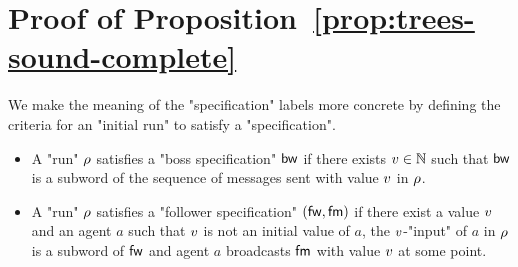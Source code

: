 \section{Proof of Proposition~\ref{prop:trees-sound-complete}}
\label{app:trees-sound-complete}

\treessoundcomplete*
 


We make the meaning of the "specification" labels more concrete by defining the criteria for an "initial run" to satisfy a "specification".

\begin{itemize}
	\item A "run" $\rho$ satisfies a "boss specification" $\mathsf{bw}$ if there exists $v \in \mathbb{N}$ such that $\mathsf{bw}$ is a subword of the sequence of messages sent with value $v$ in $\rho$.
	
	\item A "run" $\rho$ satisfies a "follower specification" $(\mathsf{fw}, \mathsf{fm})$ if there exist a value $v$ and an agent $a$ such that $v$ is not an initial value of $a$, the $v$-"input" of $a$ in $\rho$ is a subword of $\mathsf{fw}$ and agent $a$ broadcasts $\mathsf{fm}$ with value $v$ at some point.
\end{itemize}

